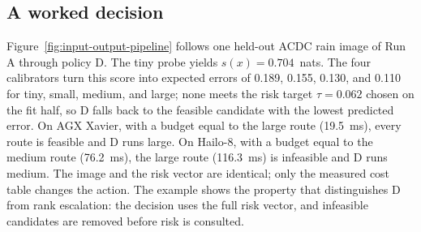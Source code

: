 \documentclass[a4paper,5p]{elsarticle}
\begin{document}
\begin{table}[!t]
\centering
\caption{Routing policies and information access. ``Per condition'' means that the deployment domain is configured before inference; pooled D removes that requirement. The oracle uses held-out ground-truth pixel error and is not deployable.}
\label{tab:policy-summary}
\small
{}
\end{table}

\subsection{A worked decision}
\label{sec:example}

Figure~\ref{fig:input-output-pipeline} follows one held-out ACDC rain image of Run A through policy D. The tiny probe yields $s(x)=0.704$~nats. The four calibrators turn this score into expected errors of 0.189, 0.155, 0.130, and 0.110 for tiny, small, medium, and large; none meets the risk target $\tau=0.062$ chosen on the fit half, so D falls back to the feasible candidate with the lowest predicted error. On AGX Xavier, with a budget equal to the large route (19.5~ms), every route is feasible and D runs large. On Hailo-8, with a budget equal to the medium route (76.2~ms), the large route (116.3~ms) is infeasible and D runs medium. The image and the risk vector are identical; only the measured cost table changes the action. The example shows the property that distinguishes D from rank escalation: the decision uses the full risk vector, and infeasible candidates are removed before risk is consulted.
\end{document}
